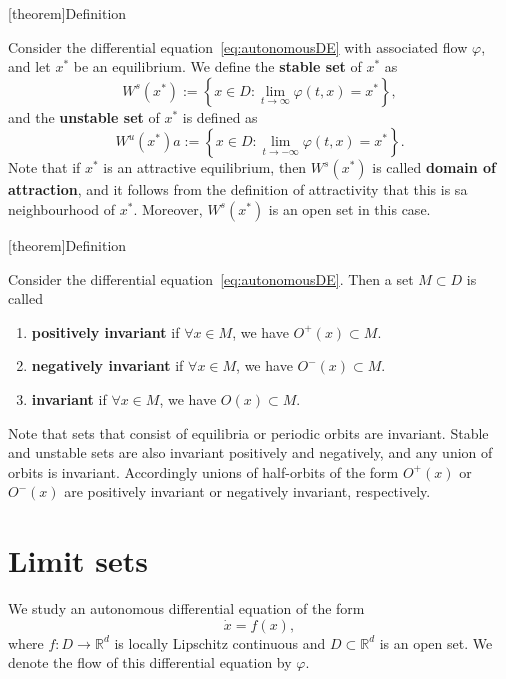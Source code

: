 \documentclass[12pt]{report}
\theoremstyle{definition}
\begin{document}
[theorem]{Definition}
\begin{stable and unstable set}
    Consider the differential equation~\eqref{eq:autonomousDE} with associated flow
    $\varphi$, and let $x^*$ be an equilibrium.
    We define the \textbf{stable set} of $x^*$ as
    \[
        W^{s}(x^{*}):=\left\{x\in D:\lim_{t\rightarrow\infty}\varphi(t,x)=x^{*}\right\},
    \]
    and the \textbf{unstable set} of $x^*$ is defined as
    \[
        W^{u}(x^*)a:=\left\{x\in D:\lim_{t\rightarrow-\infty}\varphi(t,x)=x^*\right\}.
    \]
    Note that if $x^*$ is an attractive equilibrium, then $W^{s}(x^*)$ is
    called \textbf{domain of attraction}, and it follows from the definition of
    attractivity that this is sa neighbourhood of $x^*$. Moreover,
    $W^{s}(x^*)$ is an open set in this case.
\end{stable and unstable set}

[theorem]{Definition}
\begin{invariance}
    Consider the differential equation~\eqref{eq:autonomousDE}.
    Then a set $M\subset D$ is called
    \begin{enumerate}[label = (\roman*)]
        \item \textbf{positively invariant} if $\forall x\in M$,
            we have $O^{+}(x)\subset M$.
        \item \textbf{negatively invariant} if $\forall x\in M$,
            we have $O^{-}(x)\subset M$.
        \item \textbf{invariant} if $\forall x\in M$,
            we have $O(x)\subset M$.
    \end{enumerate} 
\end{invariance}
Note that sets that consist of equilibria or periodic orbits are invariant.
Stable and unstable sets are also invariant positively and negatively,
and any union of orbits is invariant.
Accordingly unions of half-orbits of the form $O^{+}(x)$ or $O^{-}(x)$
are positively invariant or negatively invariant, respectively.

\section{Limit sets}

We study an autonomous differential equation of the form
\begin{equation}\label{eq:limitDE}
    \dot{x}=f(x),
\end{equation} 
where $f:D\rightarrow\mathbb{R}^{d}$ is locally Lipschitz continuous and
$D\subset\mathbb{R}^{d}$ is an open set.
We denote the flow of this differential equation by $\varphi$.
\end{document}
